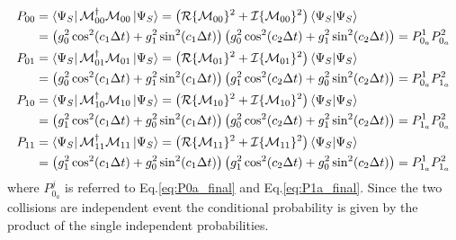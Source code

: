 \documentclass[a4paper,12pt]{article}
\begin{document}
\begin{align}
	P_{00} &= \bra{\Psi_{S}} \mathcal{M}_{00}^{\dagger} \mathcal{M}_{00} \ket{\Psi_{S}} = \left( \mathcal{R}\{ \mathcal{M}_{00} \}^2 + \mathcal{I}\{ \mathcal{M}_{00} \}^2 \right) \braket{\Psi_{S} | \Psi_{S}} \notag \\
	&= \left(g_{0}^{2} \cos^{2}(c_{1} \Delta t) + g_{1}^{2} \sin^{2}(c_{1} \Delta t) \right) \left(g_{0}^{2} \cos^{2}(c_{2} \Delta t) + g_{1}^{2} \sin^{2}(c_{2} \Delta t) \right) = P_{0_{a}}^{1} P_{0_{a}}^{2}  \label{eq:P00_complete} \\
	P_{01} &= \bra{\Psi_{S}} \mathcal{M}_{01}^{\dagger} \mathcal{M}_{01} \ket{\Psi_{S}} = \left( \mathcal{R}\{ \mathcal{M}_{01} \}^2 + \mathcal{I}\{ \mathcal{M}_{01} \}^2 \right) \braket{\Psi_{S} | \Psi_{S}} \notag \\
	&= \left(g_{0}^{2} \cos^{2}(c_{1} \Delta t) + g_{1}^{2} \sin^{2}(c_{1} \Delta t) \right) \left(g_{1}^{2} \cos^{2}(c_{2} \Delta t) + g_{0}^{2} \sin^{2}(c_{2} \Delta t) \right) = P_{0_{a}}^{1} P_{1_{a}}^{2}  \label{eq:P01_complete} \\
	P_{10} &= \bra{\Psi_{S}} \mathcal{M}_{10}^{\dagger} \mathcal{M}_{10} \ket{\Psi_{S}} = \left( \mathcal{R}\{ \mathcal{M}_{10} \}^2 + \mathcal{I}\{ \mathcal{M}_{10} \}^2 \right) \braket{\Psi_{S} | \Psi_{S}} \notag \\
	&= \left(g_{1}^{2} \cos^{2}(c_{1} \Delta t) + g_{0}^{2} \sin^{2}(c_{1} \Delta t) \right) \left(g_{0}^{2} \cos^{2}(c_{2} \Delta t) + g_{1}^{2} \sin^{2}(c_{2} \Delta t) \right) = P_{1_{a}}^{1} P_{0_{a}}^{2}  \label{eq:P10_complete} \\
	P_{11} &= \bra{\Psi_{S}} \mathcal{M}_{11}^{\dagger} \mathcal{M}_{11} \ket{\Psi_{S}} = \left( \mathcal{R}\{ \mathcal{M}_{11} \}^2 + \mathcal{I}\{ \mathcal{M}_{11} \}^2 \right) \braket{\Psi_{S} | \Psi_{S}} \notag \\
	&= \left(g_{1}^{2} \cos^{2}(c_{1} \Delta t) + g_{0}^{2} \sin^{2}(c_{1} \Delta t) \right) \left(g_{1}^{2} \cos^{2}(c_{2} \Delta t) + g_{0}^{2} \sin^{2}(c_{2} \Delta t) \right) = P_{1_{a}}^{1} P_{1_{a}}^{2}  \label{eq:P11_complete}
\end{align}
where $ P_{0_{a}}^{j} $ is referred to Eq.\ref{eq:P0a_final} and Eq.\ref{eq:P1a_final}. Since the two collisions are independent event the conditional probability is given by the product of the single independent probabilities.

\newpage
\end{document}
